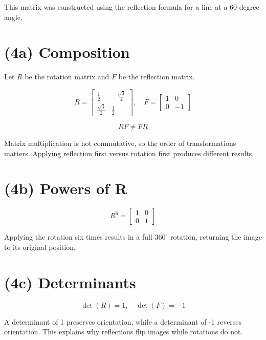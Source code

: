 \documentclass{ximera}
\begin{document}
This matrix was constructed using the reflection formula for a line at a 60 degree angle.

\section{(4a) Composition}

Let $R$ be the rotation matrix and $F$ be the reflection matrix.

\[
R =
\begin{bmatrix}
\frac{1}{2} & -\frac{\sqrt{3}}{2} \\
\frac{\sqrt{3}}{2} & \frac{1}{2}
\end{bmatrix},
\quad
F =
\begin{bmatrix}
1 & 0 \\
0 & -1
\end{bmatrix}
\]

\[
RF \neq FR
\]

Matrix multiplication is not commutative, so the order of transformations matters. Applying reflection first versus rotation first produces different results.

\section{(4b) Powers of R}

\[
R^6 =
\begin{bmatrix}
1 & 0 \\
0 & 1
\end{bmatrix}
\]

Applying the rotation six times results in a full $360^\circ$ rotation, returning the image to its original position.

\section{(4c) Determinants}

\[
\det(R) = 1, \quad \det(F) = -1
\]

A determinant of 1 preserves orientation, while a determinant of -1 reverses orientation. This explains why reflections flip images while rotations do not.
\end{document}
